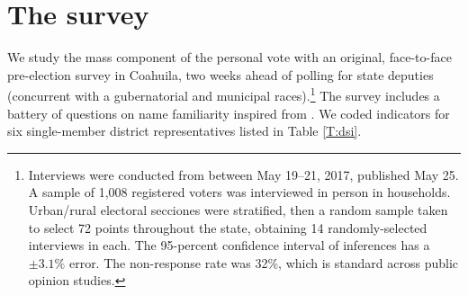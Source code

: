 \documentclass[letter,12pt]{article}
\begin{document}
\section{The survey}

We study the mass component of the personal vote with an original, face-to-face pre-election survey in Coahuila, two weeks ahead of polling for state deputies (concurrent with a gubernatorial and municipal races).\footnote{Interviews were conducted from between May 19--21, 2017, published May 25. A sample of 1,008 registered voters was interviewed in person in households. Urban/rural electoral secciones were stratified, then a random sample taken to select 72 points throughout the state, obtaining 14 randomly-selected interviews  in each. The 95-percent confidence interval of inferences has a $\pm3.1\%$ error. The non-response rate was 32\%, which is standard across public opinion studies.} The survey includes a battery of questions on name familiarity inspired from \citet{cain.etal.1987}. We coded indicators for six single-member district representatives listed in Table \ref{T:dsi}.  

\end{document}
